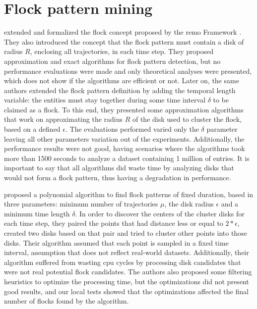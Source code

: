 \section{Flock pattern mining}
\label{sec:rel_flocks}
 extended and formalized the flock concept proposed by the \ac{remo} Framework
\cite{remo}. They also introduced the concept that the flock pattern must contain a disk of radius $R$, enclosing all
trajectories, in each time step. They proposed approximation and exact algorithms for flock pattern detection, but no
performance evaluations were made and only theoretical analyses were presented, which does not show if the algorithms
are efficient or not. Later on, the same authors \cite{gudlongest} extended the flock pattern definition by adding the
temporal length variable: the entities must stay together during some time interval $\delta$ to be claimed as a flock.
To this end, they presented some approximation algorithms that work on approximating the radius $R$ of the disk used to
cluster the flock, based on a defined $\epsilon$. The evaluations performed \cite{gudlongest} varied only the $\delta$
parameter leaving all other parameters variation out of the experiments. Additionally, the performance results were not
good, having scenarios where the algorithms took more than 1500 seconds to analyze a dataset containing 1 million of
entries. It is important to say that all algorithms did waste time by analyzing disks that would not form a flock
pattern, thus having a degradation in performance.

 proposed a polynomial algorithm to find flock patterns of fixed duration, based in three parameters:
minimum number of trajectories $\mu$, the disk radius $\epsilon$ and a minimum time length $\delta$. In order to
discover the centers of the cluster disks for each time step, they paired the points that had distance less or equal to
$2*\epsilon$, created two disks based on that pair and tried to cluster other points into those disks. Their algorithm
assumed that each point is sampled in a fixed time interval, assumption that does not reflect real-world datasets.
Additionally, their algorithm suffered from wasting \ac{cpu} cycles by processing disk candidates that were not real
potential flock candidates. The authors also proposed some filtering heuristics to optimize the processing time, but the
optimizations did not present good results, and our local tests showed that the optimizations affected the final number
of flocks found by the algorithm.

